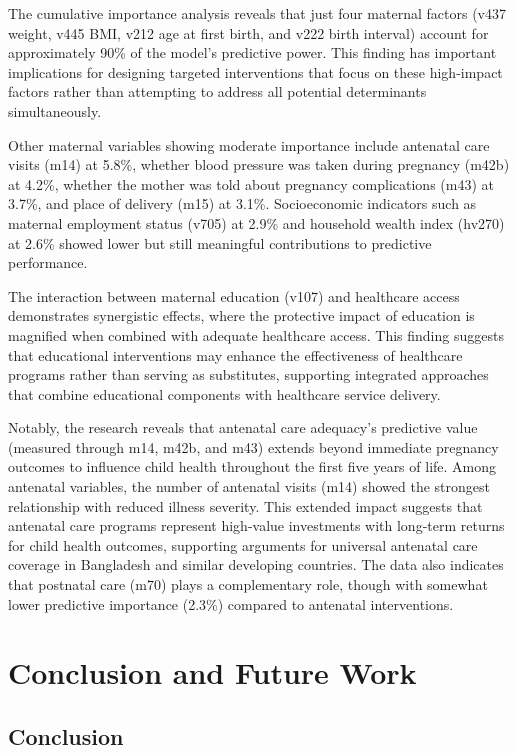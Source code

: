 \documentclass[12pt]{report}
\begin{document}
The cumulative importance analysis reveals that just four maternal factors (v437 weight, v445 BMI, v212 age at first birth, and v222 birth interval) account for approximately 90\% of the model's predictive power. This finding has important implications for designing targeted interventions that focus on these high-impact factors rather than attempting to address all potential determinants simultaneously.

Other maternal variables showing moderate importance include antenatal care visits (m14) at 5.8\%, whether blood pressure was taken during pregnancy (m42b) at 4.2\%, whether the mother was told about pregnancy complications (m43) at 3.7\%, and place of delivery (m15) at 3.1\%. Socioeconomic indicators such as maternal employment status (v705) at 2.9\% and household wealth index (hv270) at 2.6\% showed lower but still meaningful contributions to predictive performance.

The interaction between maternal education (v107) and healthcare access demonstrates synergistic effects, where the protective impact of education is magnified when combined with adequate healthcare access. This finding suggests that educational interventions may enhance the effectiveness of healthcare programs rather than serving as substitutes, supporting integrated approaches that combine educational components with healthcare service delivery.

Notably, the research reveals that antenatal care adequacy's predictive value (measured through m14, m42b, and m43) extends beyond immediate pregnancy outcomes to influence child health throughout the first five years of life. Among antenatal variables, the number of antenatal visits (m14) showed the strongest relationship with reduced illness severity. This extended impact suggests that antenatal care programs represent high-value investments with long-term returns for child health outcomes, supporting arguments for universal antenatal care coverage in Bangladesh and similar developing countries. The data also indicates that postnatal care (m70) plays a complementary role, though with somewhat lower predictive importance (2.3\%) compared to antenatal interventions.

\chapter{Conclusion and Future Work}


\section{Conclusion}
\end{document}
